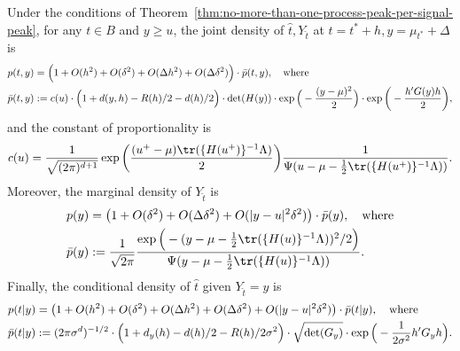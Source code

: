 \documentclass{article}
\begin{document}
	\begin{theorem}
		\label{thm:approximate-joint-distribution}
		Under the conditions of Theorem~\ref{thm:no-more-than-one-process-peak-per-signal-peak}, for any $t \in B$ and $y \geq u$, the joint density of $\hat{t},Y_{\hat{t}}$ at $t = t^* + h,y = \mu_{t^*} + \Delta$ is
		\begin{equation}
			\label{eqn:approximate-joint-density}
			\begin{aligned}
				p(t,y) & = \Big(1 + O(h^2) + O(\delta^2) + O(\Delta h^2) + O(\Delta\delta^2)\Big) \cdot \bar{p}(t,y), \quad {\rm where} \\
				\bar{p}(t,y) & := c(u) \cdot\Big(1 + d(y,h) - R(h)/2 - d(h)/2\Big) \cdot \det(H(y)) \cdot \exp\Big(-\frac{(y - \mu)^2}{2}\Big) \cdot \exp\bigg(-\frac{h' G(y)h}{2}\bigg),
			\end{aligned}
		\end{equation}
		and the constant of proportionality is
		\begin{equation}
			\label{eqn:approximate-joint-density-constant-of-proportionality}
			c(u) = \frac{1}{\sqrt{(2\pi)^{d + 1}}} \exp\bigg(\frac{(u^+ - \mu)\tr(\{H(u^{+})\}^{-1}\Lambda)}{2}\bigg)
			\frac{1}{\Psi(u - \mu - \frac{1}{2}\tr(\{H(u^{+})\}^{-1}\Lambda))}.
		\end{equation}
		Moreover, the marginal density of $Y_{\hat{t}}$ is 
		\begin{equation}
			\label{eqn:approximate-marginal-density-height}
			\begin{aligned}
				p(y) & = \big(1 + O(\delta^2) + O(\Delta \delta^2) + O(|y - u|^2 \delta^2)\big) \cdot \bar{p}(y), \quad {\rm where} \\ 
				\bar{p}(y) & := \frac{1}{\sqrt{2\pi}}\frac{\exp\Big(-(y - \mu - \frac{1}{2}\tr(\{H(u)\}^{-1}\Lambda))^2/2\Big) }{\Psi(y - \mu - \frac{1}{2}\tr(\{H(u)\}^{-1}\Lambda))}.
			\end{aligned}
		\end{equation}
		Finally, the conditional density of $\hat{t}$ given $Y_{\hat{t}} = y$ is 
		\begin{equation}
			\label{eqn:approximate-conditional-density-location}
			\begin{aligned}
				p(t|y) & = \big(1 + O(h^2) + O(\delta^2) + O(\Delta h^2) + O(\Delta\delta^2) + O(|y - u|^2 \delta^2)\big) \cdot \bar{p}(t|y), \quad {\rm where} \\
				\bar{p}(t|y) & := (2\pi\sigma^{d})^{-1/2} \cdot \Big(1 + d_y(h) - d(h)/2 - R(h)/2\sigma^2\Big) \cdot \sqrt{\det(G_y)} \cdot \exp\Big(-\frac{1}{2\sigma^2}h'G_y h\Big).
			\end{aligned}
		\end{equation}
	\end{theorem}
\end{document}
